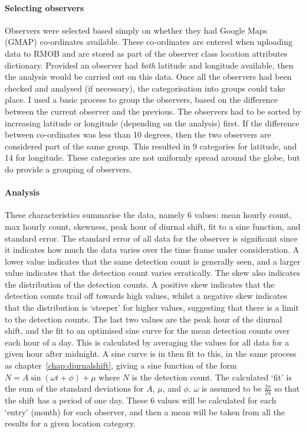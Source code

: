 \paragraph{Selecting observers\\}
Observers were selected based simply on whether they had Google Maps (GMAP) co-ordinates available. These co-ordinates are entered when uploading data to RMOB and are stored as part of the observer class location attributes dictionary. Provided an observer had {\it both} latitude and longitude available, then the analysis would be carried out on this data. Once all the observers had been checked and analysed (if necessary), the categorisation into groups could take place.
I used a basic process to group the observers, based on the difference between the current observer and the previous. The observers had to be sorted by increasing latitude or longitude (depending on the analysis) first. If the difference between co-ordinates was less than 10 degrees, then the two observers are considered part of the same group. This resulted in 9 categories for latitude, and 14 for longitude. These categories are not uniformly spread around the globe, but do provide a grouping of observers.
\paragraph{Analysis\\}
These characteristics summarise the data, namely 6 values: mean hourly count, max hourly count, skewness, peak hour of diurnal shift, fit to a sine function, and standard error. The standard error of all data for the observer is significant since it indicates how much the data varies over the time frame under consideration. A lower value indicates that the same detection count is generally seen, and a larger value indicates that the detection count varies erratically. The skew also indicates the distribution of the detection counts. A positive skew indicates that the detection counts trail off towards high values, whilst a negative skew indicates that the distribution is `steeper' for higher values, suggesting that there is a limit to the detection counts. The last two values are the peak hour of the diurnal shift, and the fit to an optimised sine curve for the mean detection counts over each hour of a day. This is calculated by averaging the values for all data for a given hour after midnight. A sine curve is in then fit to this, in the same process as chapter~\ref{chap:diurnalshift}, giving a sine function of the form $N = A \sin \left( \omega t + \phi \right) + \mu$ where $N$ is the detection count. The calculated `fit' is the sum of the standard deviations for $A$, $\mu$, and $\phi$. $\omega$ is assumed to be $\frac{2\pi}{24}$ so that the shift has a period of one day.
These 6 values will be calculated for each `entry' (month) for each observer, and then a mean will be taken from all the results for a given location category.

